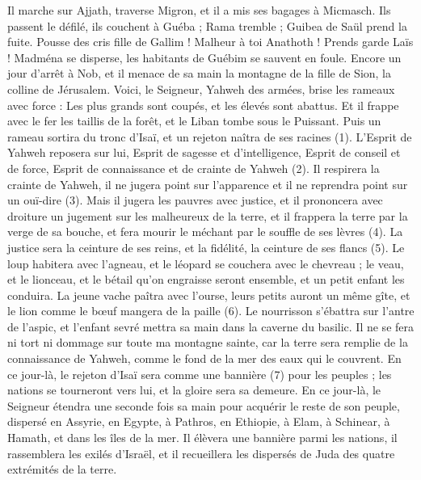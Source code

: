 \begin{multicols}{2}
Il marche sur Ajjath, traverse Migron, et il a mis ses bagages à Micmasch.
Ils passent le défilé, ils couchent à Guéba ; Rama tremble ; Guibea de Saül prend la fuite.
Pousse des cris fille de Gallim ! Malheur à toi Anathoth ! Prends garde Laïs !
Madména se disperse, les habitants de Guébim se sauvent en foule.
Encore un jour d’arrêt à Nob, et il menace de sa main la montagne de la fille de Sion, la colline de Jérusalem.
Voici, le Seigneur, Yahweh des armées, brise les rameaux avec force : Les plus grands sont coupés, et les élevés sont abattus.
Et il frappe avec le fer les taillis de la forêt, et le Liban tombe sous le Puissant.
\VerseOne{}Puis un rameau sortira du tronc d'Isaï, et un rejeton naîtra de ses racines (1).
L'Esprit de Yahweh reposera sur lui, Esprit de sagesse et d'intelligence, Esprit de conseil et de force, Esprit de connaissance et de crainte de Yahweh (2).
Il respirera la crainte de Yahweh, il ne jugera point sur l’apparence et il ne reprendra point sur un ouï-dire (3).
Mais il jugera les pauvres avec justice, et il prononcera avec droiture un jugement sur les malheureux de la terre, et il frappera la terre par la verge de sa bouche, et fera mourir le méchant par le souffle de ses lèvres (4).
La justice sera la ceinture de ses reins, et la fidélité, la ceinture de ses flancs (5).
Le loup habitera avec l'agneau, et le léopard se couchera avec le chevreau ; le veau, et le lionceau, et le bétail qu'on engraisse seront ensemble, et un petit enfant les conduira.
La jeune vache paîtra avec l'ourse, leurs petits auront un même gîte, et le lion comme le bœuf mangera de la paille (6).
Le nourrisson s'ébattra sur l’antre de l'aspic, et l'enfant sevré mettra sa main dans la caverne du basilic.
Il ne se fera ni tort ni dommage sur toute ma montagne sainte, car la terre sera remplie de la connaissance de Yahweh, comme le fond de la mer des eaux qui le couvrent.
En ce jour-là, le rejeton d’Isaï sera comme une bannière (7) pour les peuples ; les nations se tourneront vers lui, et la gloire sera sa demeure.
En ce jour-là, le Seigneur étendra une seconde fois sa main pour acquérir le reste de son peuple, dispersé en Assyrie, en Egypte, à Pathros, en Ethiopie, à Elam, à Schinear, à Hamath, et dans les îles de la mer.
Il élèvera une bannière parmi les nations, il rassemblera les exilés d’Israël, et il recueillera les dispersés de Juda des quatre extrémités de la terre.

\end{multicols}
